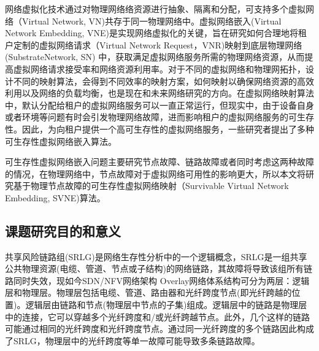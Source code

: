 


网络虚拟化\cite{chowdhury2009network}技术通过对物理网络络资源进行抽象、隔离和分配，可支持多个虚拟网络（Virtual Network, VN)共存于同一物理网络中。虚拟网络嵌入\cite{fischer2013virtual}(Virtual Network Embedding, VNE)是实现网络虚拟化的关键，旨在研究如何合理地将租户定制的虚拟网络请求（Virtual Network Request，VNR)映射到底层物理网络 (SubstrateNetwork, SN) 中，获取满足虚拟网络服务所需的物理网络资源，从而提高虚拟网络请求接受率和网络资源利用率。对于不同的虚拟网络和物理网拓扑，设计不同的映射算法，会得到不同效率的映射方案，如何映射以确保网络资源的高效利用以及网络的负载均衡，也是现在和未来网络研究的方向。在虚拟网络映射算法中，默认分配给租户的虚拟网络服务可以一直正常运行，但现实中，由于设备自身或者环境等问题有时会引发物理网络故障，进而影响租户的虚拟网络服务的可生存性。因此，为向租户提供一个高可生存性的虚拟网络服务，一些研究者提出了多种可生存性虚拟网络嵌入算法\cite{herker2013survey}。

可生存性虚拟网络嵌入问题主要研究节点故障、链路故障或者同时考虑这两种故障的情况，在物理网络中，节点故障对于虚拟网络可用性的影响更大，所以本文将研究基于物理节点故障的可生存性虚拟网络映射（Survivable Virtual Network Embedding, SVNE)算法。


\subsection{课题研究目的和意义}
共享风险链路组(SRLG)是网络生存性分析中的一个逻辑概念，SRLG是一组共享公共物理资源(电缆、管道、节点或子结构)的网络链路，其故障将导致该组所有链路同时失效，现如今SDN/NFV网络架构 Overlay网络体系结构可分为两层：逻辑层和物理层。物理层包括电缆、管道、路由器和光纤跨度节点(即光纤跨越的位置)。逻辑层由链路和节点(物理层中节点的子集)组成。逻辑层中的链路是物理层中的连接，它可以穿越多个光纤跨度和/或光纤跨越节点。此外，几个这样的链路可能通过相同的光纤跨度和光纤跨度节点。通过同一光纤跨度的多个链路因此构成了SRLG，物理层中的光纤跨度等单一故障可能导致多条链路故障。

